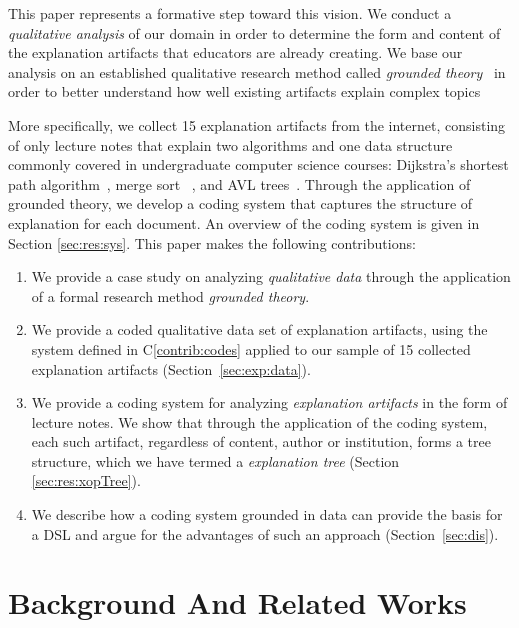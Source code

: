 \documentclass[sigconf]{acmart}
\begin{document}
This paper represents a formative step toward this vision. We conduct a
\emph{qualitative analysis} of our domain in order to determine the form and
content of the explanation artifacts that educators are already creating.
%
We base our analysis on an established qualitative research method called
\emph{grounded theory}~\cite{Strauss67discoveryof} in order to better understand
how well existing artifacts explain complex topics


More specifically, we collect 15 explanation artifacts from the internet,
consisting of only lecture notes that explain two algorithms and one
data structure commonly covered in undergraduate computer science courses:
Dijkstra's shortest path algorithm~\cite[pp.~137--142]{KT06}, merge sort
~\cite[210--214]{KT06}, and AVL trees~\cite[pp.~458--475]{KnuthArt3}.
%
Through the application of grounded theory, we develop a coding system that
captures the structure of explanation for each document. An overview of the
coding system is given in Section \ref{sec:res:sys}. This paper makes the
following contributions:
%
\begin{enumerate}[C1.]

\item \label{contrib:method}
  We provide a case study on analyzing \emph{qualitative data} through the
  application of a formal research method \emph{grounded theory}.

\item \label{contrib:data}
%
We provide a coded qualitative data set of explanation artifacts, using the
system defined in C\ref{contrib:codes} applied to our sample of 15 collected
explanation artifacts (Section~\ref{sec:exp:data}).

\item \label{contrib:codes}
%
  We provide a coding system for analyzing \emph{explanation artifacts} in the
  form of lecture notes. We show that through the application of the coding
  system, each such artifact, regardless of content, author or institution,
  forms a tree structure, which we have termed a \emph{explanation tree}
  (Section \ref{sec:res:xopTree}).


\item \label{contrib:DSL}
%
  We describe how a coding system grounded in data can provide the
  basis for a DSL and argue for the advantages of such an approach
  (Section~\ref{sec:dis}).
%
\end{enumerate}

\noindent

\section{Background And Related Works}
\label{sec:back}
\end{document}
